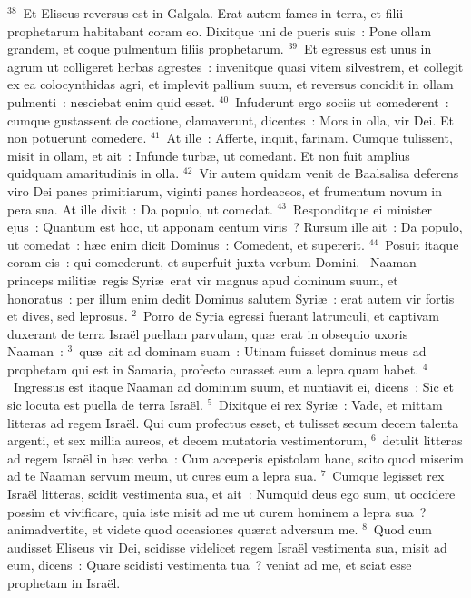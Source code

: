 ${}^{38}$~Et Eliseus reversus est in Galgala. Erat autem fames in terra, et filii prophetarum habitabant coram eo. Dixitque uni de pueris suis~: Pone ollam grandem, et coque pulmentum filiis prophetarum.
${}^{39}$~Et egressus est unus in agrum ut colligeret herbas agrestes~: invenitque quasi vitem silvestrem, et collegit ex ea colocynthidas agri, et implevit pallium suum, et reversus concidit in ollam pulmenti~: nesciebat enim quid esset.
${}^{40}$~Infuderunt ergo sociis ut comederent~: cumque gustassent de coctione, clamaverunt, dicentes~: Mors in olla, vir Dei. Et non potuerunt comedere.
${}^{41}$~At ille~: Afferte, inquit, farinam. Cumque tulissent, misit in ollam, et ait~: Infunde turb\ae , ut comedant. Et non fuit amplius quidquam amaritudinis in olla.
${}^{42}$~Vir autem quidam venit de Baalsalisa deferens viro Dei panes primitiarum, viginti panes hordeaceos, et frumentum novum in pera sua. At ille dixit~: Da populo, ut comedat.
${}^{43}$~Responditque ei minister ejus~: Quantum est hoc, ut apponam centum viris~? Rursum ille ait~: Da populo, ut comedat~: h\ae c enim dicit Dominus~: Comedent, et supererit.
${}^{44}$~Posuit itaque coram eis~: qui comederunt, et superfuit juxta verbum Domini.
~Naaman princeps militi\ae\ regis Syri\ae\ erat vir magnus apud dominum suum, et honoratus~: per illum enim dedit Dominus salutem Syri\ae~: erat autem vir fortis et dives, sed leprosus.
${}^{2}$~Porro de Syria egressi fuerant latrunculi, et captivam duxerant de terra Isra\"el puellam parvulam, qu\ae\ erat in obsequio uxoris Naaman~:
${}^{3}$~qu\ae\ ait ad dominam suam~: Utinam fuisset dominus meus ad prophetam qui est in Samaria, profecto curasset eum a lepra quam habet.
${}^{4}$~Ingressus est itaque Naaman ad dominum suum, et nuntiavit ei, dicens~: Sic et sic locuta est puella de terra Isra\"el.
${}^{5}$~Dixitque ei rex Syri\ae~: Vade, et mittam litteras ad regem Isra\"el. Qui cum profectus esset, et tulisset secum decem talenta argenti, et sex millia aureos, et decem mutatoria vestimentorum,
${}^{6}$~detulit litteras ad regem Isra\"el in h\ae c verba~: Cum acceperis epistolam hanc, scito quod miserim ad te Naaman servum meum, ut cures eum a lepra sua.
${}^{7}$~Cumque legisset rex Isra\"el litteras, scidit vestimenta sua, et ait~: Numquid deus ego sum, ut occidere possim et vivificare, quia iste misit ad me ut curem hominem a lepra sua~? animadvertite, et videte quod occasiones qu\ae rat adversum me.
${}^{8}$~Quod cum audisset Eliseus vir Dei, scidisse videlicet regem Isra\"el vestimenta sua, misit ad eum, dicens~: Quare scidisti vestimenta tua~? veniat ad me, et sciat esse prophetam in Isra\"el.
